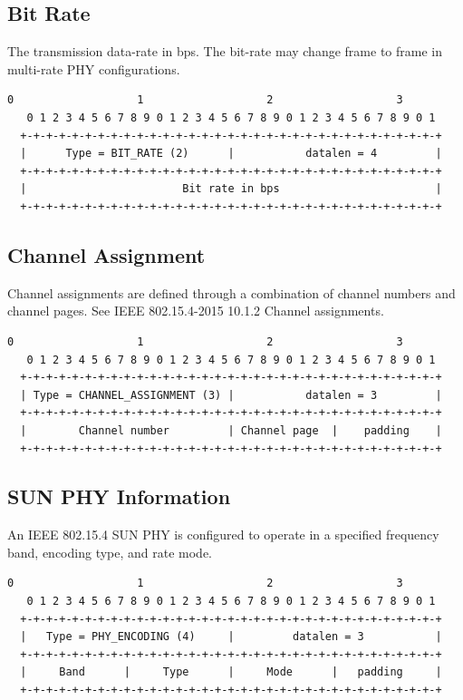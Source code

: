 \documentclass[12pt]{article}
\renewcommand\_{\textunderscore\allowbreak}
\begin{document}
\newpage
\subsection{Bit Rate}

The transmission data-rate in bps.  The bit-rate may change frame to frame in
multi-rate PHY configurations.

\begin{Verbatim}[samepage=true]
   0                   1                   2                   3
   0 1 2 3 4 5 6 7 8 9 0 1 2 3 4 5 6 7 8 9 0 1 2 3 4 5 6 7 8 9 0 1
  +-+-+-+-+-+-+-+-+-+-+-+-+-+-+-+-+-+-+-+-+-+-+-+-+-+-+-+-+-+-+-+-+
  |      Type = BIT_RATE (2)      |           datalen = 4         |
  +-+-+-+-+-+-+-+-+-+-+-+-+-+-+-+-+-+-+-+-+-+-+-+-+-+-+-+-+-+-+-+-+
  |                        Bit rate in bps                        |
  +-+-+-+-+-+-+-+-+-+-+-+-+-+-+-+-+-+-+-+-+-+-+-+-+-+-+-+-+-+-+-+-+
\end{Verbatim}

\subsection{Channel Assignment}

Channel assignments are defined through a combination of channel numbers and
channel pages.  See IEEE 802.15.4-2015 10.1.2 Channel assignments.
\begin{Verbatim}[samepage=true]
   0                   1                   2                   3
   0 1 2 3 4 5 6 7 8 9 0 1 2 3 4 5 6 7 8 9 0 1 2 3 4 5 6 7 8 9 0 1
  +-+-+-+-+-+-+-+-+-+-+-+-+-+-+-+-+-+-+-+-+-+-+-+-+-+-+-+-+-+-+-+-+
  | Type = CHANNEL_ASSIGNMENT (3) |           datalen = 3         |
  +-+-+-+-+-+-+-+-+-+-+-+-+-+-+-+-+-+-+-+-+-+-+-+-+-+-+-+-+-+-+-+-+
  |        Channel number         | Channel page  |    padding    |
  +-+-+-+-+-+-+-+-+-+-+-+-+-+-+-+-+-+-+-+-+-+-+-+-+-+-+-+-+-+-+-+-+
\end{Verbatim}

\subsection{SUN PHY Information}

An IEEE 802.15.4 SUN PHY is configured to operate in a specified frequency
band, encoding type, and rate mode.

\begin{Verbatim}[samepage=true]
   0                   1                   2                   3
   0 1 2 3 4 5 6 7 8 9 0 1 2 3 4 5 6 7 8 9 0 1 2 3 4 5 6 7 8 9 0 1
  +-+-+-+-+-+-+-+-+-+-+-+-+-+-+-+-+-+-+-+-+-+-+-+-+-+-+-+-+-+-+-+-+
  |   Type = PHY_ENCODING (4)     |         datalen = 3           |
  +-+-+-+-+-+-+-+-+-+-+-+-+-+-+-+-+-+-+-+-+-+-+-+-+-+-+-+-+-+-+-+-+
  |     Band      |     Type      |     Mode      |   padding     |
  +-+-+-+-+-+-+-+-+-+-+-+-+-+-+-+-+-+-+-+-+-+-+-+-+-+-+-+-+-+-+-+-+
\end{Verbatim}
\end{document}
